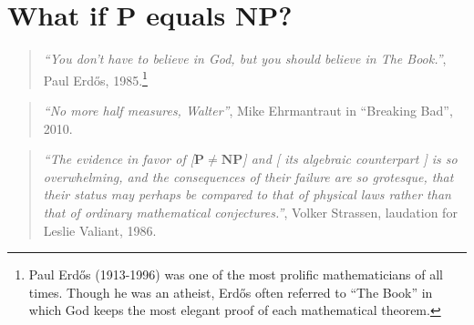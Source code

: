 \chapter{What if P equals NP?}\label{chappvsnp}


\begin{quote}
\emph{``You don't have to believe in God, but you should believe in The
Book.''}, Paul Erdős, 1985.\footnote{Paul Erdős (1913-1996) was one of
  the most prolific mathematicians of all times. Though he was an
  atheist, Erdős often referred to ``The Book'' in which God keeps the
  most elegant proof of each mathematical theorem.}
\end{quote}

\begin{quote}
\emph{``No more half measures, Walter''}, Mike Ehrmantraut in ``Breaking
Bad'', 2010.
\end{quote}

\begin{quote}
\emph{``The evidence in favor of {[}\(\mathbf{P}\neq \mathbf{NP}\){]}
and {[} its algebraic counterpart {]} is so overwhelming, and the
consequences of their failure are so grotesque, that their status may
perhaps be compared to that of physical laws rather than that of
ordinary mathematical conjectures.''}, Volker Strassen, laudation for
Leslie Valiant, 1986.
\end{quote}

